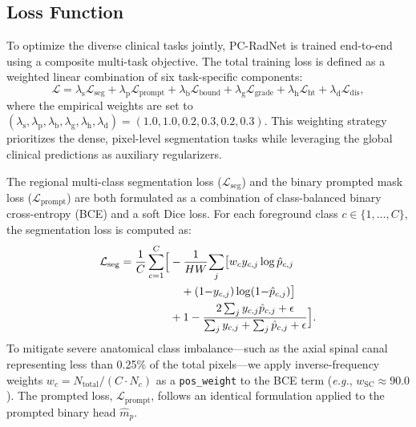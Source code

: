\documentclass[journal]{IEEEtran}
\makeatletter
\newcommand{\modelname}{PC-RadNet}
\newcommand{\eg}{\textit{e.g.}\@\xspace}
\makeatother
\begin{document}
\subsection{Loss Function}
\label{sec:loss}

To optimize the diverse clinical tasks jointly, \modelname{} is trained end-to-end using a composite multi-task objective. The total training loss is defined as a weighted linear combination of six task-specific components:
\begin{equation}
    \mathcal{L} = \lambda_\text{s}\mathcal{L}_\text{seg} + \lambda_\text{p}\mathcal{L}_\text{prompt} + \lambda_\text{b}\mathcal{L}_\text{bound} + \lambda_\text{g}\mathcal{L}_\text{grade} + \lambda_\text{h}\mathcal{L}_\text{ht} + \lambda_\text{d}\mathcal{L}_\text{dis},
    \label{eq:loss}
\end{equation}
where the empirical weights are set to $(\lambda_\text{s}, \lambda_\text{p}, \lambda_\text{b}, \lambda_\text{g}, \lambda_\text{h}, \lambda_\text{d}) = (1.0, 1.0, 0.2, 0.3, 0.2, 0.3)$. This weighting strategy prioritizes the dense, pixel-level segmentation tasks while leveraging the global clinical predictions as auxiliary regularizers.

The regional multi-class segmentation loss ($\mathcal{L}_\text{seg}$) and the binary prompted mask loss ($\mathcal{L}_\text{prompt}$) are both formulated as a combination of class-balanced binary cross-entropy (BCE) and a soft Dice loss. For each foreground class $c \in \{1, \ldots, C\}$, the segmentation loss is computed as:
\begin{equation}
\begin{split}
    \mathcal{L}_\text{seg} = \frac{1}{C}\sum_{c=1}^{C} \Bigl[
    &-\frac{1}{HW}\!\sum_{j}\bigl[w_c  y_{c,j} \log \hat{p}_{c,j} \\
    &\quad+ (1{-}y_{c,j}) \log (1{-}\hat{p}_{c,j})\bigr] \\
    &+ 1 - \frac{2\sum_j y_{c,j}\hat{p}_{c,j} + \epsilon}{\sum_j y_{c,j} + \sum_j \hat{p}_{c,j} + \epsilon}\Bigr].
\end{split}
    \label{eq:seg_loss}
\end{equation}
To mitigate severe anatomical class imbalance—such as the axial spinal canal representing less than 0.25\% of the total pixels—we apply inverse-frequency weights $w_c = N_\text{total} / (C \cdot N_c)$ as a \texttt{pos\_weight} to the BCE term (\eg, $w_\text{SC} \approx 90.0$). The prompted loss, $\mathcal{L}_\text{prompt}$, follows an identical formulation applied to the prompted binary head $\hat{m}_p$.
\end{document}
